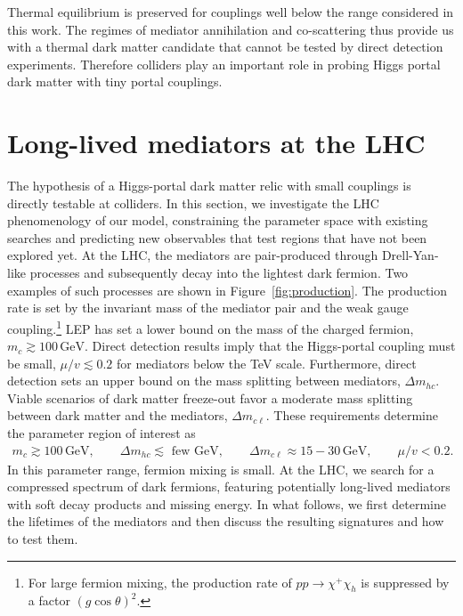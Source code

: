 \documentclass[nofootinbib,prd,aps,superscriptaddress,preprintnumbers]{revtex4}
\begin{document}
Thermal equilibrium is preserved for couplings well below the range considered in this work. The regimes of mediator annihilation and co-scattering thus provide us with a thermal dark matter candidate that cannot be tested by direct detection experiments. Therefore colliders play an important role in probing Higgs portal dark matter with tiny portal couplings.

\section{Long-lived mediators at the LHC}\label{sec:lhc}
%
\noindent
The hypothesis of a Higgs-portal dark matter relic with small couplings is directly testable at colliders. In this section, we investigate the LHC phenomenology of our model, constraining the parameter space with existing searches and predicting new observables that test regions that have not been explored yet. At the LHC, the mediators are pair-produced through Drell-Yan-like processes and subsequently decay into the lightest dark fermion. Two examples of such processes are shown in Figure~\ref{fig:production}. The production rate is set by the invariant mass of the mediator pair and the weak gauge coupling.\footnote{For large fermion mixing, the production rate of $pp\to \chi^+\chi_h$ is suppressed by a factor $(g\cos\theta)^2$.} LEP has set a lower bound on the mass of the charged fermion, $m_c \gtrsim 100\,\text{GeV}$. Direct detection results imply that the Higgs-portal coupling must be small, $\mu/v \lesssim 0.2$ for mediators below the TeV scale. Furthermore, direct detection sets an upper bound on the mass splitting between mediators, $\Delta m_{hc}$. Viable scenarios of dark matter freeze-out favor a moderate mass splitting between dark matter and the mediators, $\Delta m_{c\ell}$. These requirements determine the parameter region of interest as
\begin{align}\label{eq:params}
m_c \gtrsim 100\,\text{GeV},\qquad \Delta m_{hc} \lesssim \text{ few GeV},\qquad \Delta m_{c\ell} \approx 15-30\,\text{GeV}, \qquad \mu/v < 0.2.
\end{align}
In this parameter range, fermion mixing is small. At the LHC, we search for a compressed spectrum of dark fermions, featuring potentially long-lived mediators with soft decay products and missing energy. In what follows, we first determine the lifetimes of the mediators and then discuss the resulting signatures and how to test them.
%
\end{document}
